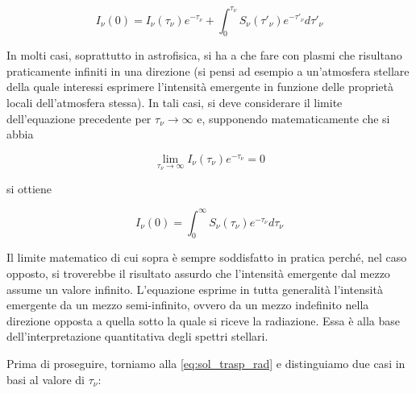 \begin{equation}
  I_{\nu}(0)=I_{\nu}(\tau_{\nu}) e^{-\tau_{\nu}} + \int_{0}^{\tau_{\nu}} S_{\nu}(\tau'_{\nu}) e^{-\tau'_{\nu}} d\tau'_{\nu}
  \label{eq:sol_trasp_rad}
\end{equation}

In molti casi, soprattutto in astrofisica, si ha a che fare con plasmi che risultano praticamente infiniti in una direzione (si pensi ad esempio a un'atmosfera stellare della quale interessi esprimere l'intensità emergente in funzione delle proprietà locali dell'atmosfera stessa). In tali casi, si deve considerare il limite dell'equazione precedente per $\tau_{\nu} \to \infty$ e, supponendo matematicamente che si abbia

$$\lim_{\tau_{\nu} \to \infty} I_{\nu}(\tau_{\nu}) e^{-\tau_{\nu}}=0$$

si ottiene

\begin{equation}
  I_{\nu}(0)= \int_{0}^{\infty} S_{\nu}(\tau_{\nu}) e^{-\tau_{\nu}} d\tau_{\nu}
  \label{eq:sol_trasp_rad_spessore_infinito}
\end{equation}

Il limite matematico di cui sopra è sempre soddisfatto in pratica perché, nel caso opposto, si troverebbe il risultato assurdo che l'intensità emergente dal mezzo assume un valore infinito. L'equazione esprime in tutta generalità l'intensità emergente da un mezzo semi-infinito, ovvero da un mezzo indefinito nella direzione opposta a quella sotto la quale si riceve la radiazione. Essa è alla base dell'interpretazione quantitativa degli spettri stellari.






Prima di proseguire, torniamo alla \eqref{eq:sol_trasp_rad} e distinguiamo due casi in basi al valore di $\tau_{\nu}$:

